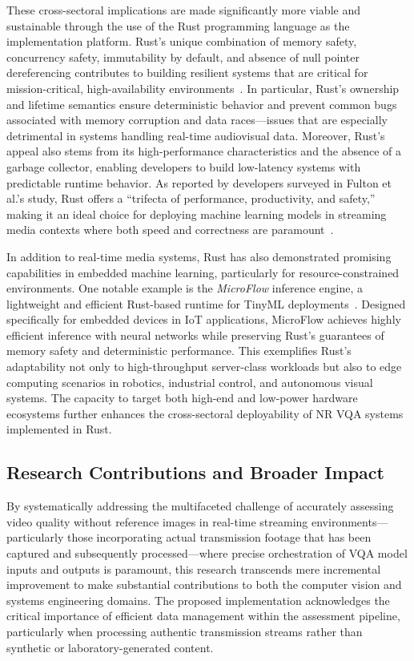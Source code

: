 These cross-sectoral implications are made significantly more viable and sustainable through the use of the Rust programming language as the implementation platform. Rust's unique combination of memory safety, concurrency safety, immutability by default, and absence of null pointer dereferencing contributes to building resilient systems that are critical for mission-critical, high-availability environments~\cite{fulton2022benefits}. In particular, Rust's ownership and lifetime semantics ensure deterministic behavior and prevent common bugs associated with memory corruption and data races—issues that are especially detrimental in systems handling real-time audiovisual data. Moreover, Rust's appeal also stems from its high-performance characteristics and the absence of a garbage collector, enabling developers to build low-latency systems with predictable runtime behavior. As reported by developers surveyed in Fulton et al.'s study, Rust offers a “trifecta of performance, productivity, and safety,” making it an ideal choice for deploying machine learning models in streaming media contexts where both speed and correctness are paramount~\cite{fulton2022benefits}.

In addition to real-time media systems, Rust has also demonstrated promising capabilities in embedded machine learning, particularly for resource-constrained environments. One notable example is the \emph{MicroFlow} inference engine, a lightweight and efficient Rust-based runtime for TinyML deployments~\cite{carnelos2025microflow}. Designed specifically for embedded devices in IoT applications, MicroFlow achieves highly efficient inference with neural networks while preserving Rust's guarantees of memory safety and deterministic performance. This exemplifies Rust's adaptability not only to high-throughput server-class workloads but also to edge computing scenarios in robotics, industrial control, and autonomous visual systems. The capacity to target both high-end and low-power hardware ecosystems further enhances the cross-sectoral deployability of NR VQA systems implemented in Rust.

\subsection{Research Contributions and Broader Impact}

By systematically addressing the multifaceted challenge of accurately assessing video quality without reference images in real-time streaming environments---particularly those incorporating actual transmission footage that has been captured and subsequently processed---where precise orchestration of VQA model inputs and outputs is paramount, this research transcends mere incremental improvement to make substantial contributions to both the computer vision and systems engineering domains. The proposed implementation acknowledges the critical importance of efficient data management within the assessment pipeline, particularly when processing authentic transmission streams rather than synthetic or laboratory-generated content.

